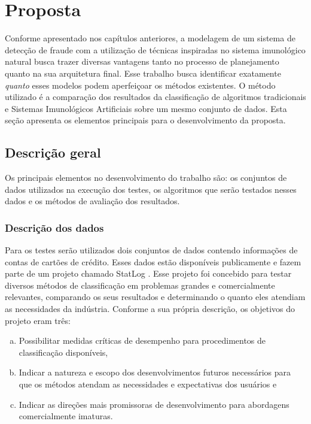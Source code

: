\chapter{Proposta}

Conforme apresentado nos capítulos anteriores, a modelagem de um sistema de detecção de fraude com a utilização de técnicas inspiradas no sistema imunológico natural busca trazer diversas vantagens tanto no processo de planejamento quanto na sua arquitetura final. Esse trabalho busca identificar exatamente \emph{quanto} esses modelos podem aperfeiçoar os métodos existentes. O método utilizado é a comparação dos resultados da classificação de algoritmos tradicionais e Sistemas Imunológicos Artificiais sobre um mesmo conjunto de dados. Esta seção apresenta os elementos principais para o desenvolvimento da proposta.

\section{Descrição geral}

Os principais elementos no desenvolvimento do trabalho são: os conjuntos de dados utilizados na execução dos testes, os algoritmos que serão testados nesses dados e os métodos de avaliação dos resultados.

\subsection{Descrição dos dados}

Para os testes serão utilizados dois conjuntos de dados contendo informações de contas de cartões de crédito. Esses dados estão disponíveis publicamente e fazem parte de um projeto chamado StatLog \cite{Michie1994}. Esse projeto foi concebido para testar diversos métodos de classificação em problemas grandes e comercialmente relevantes, comparando os seus resultados e determinando o quanto eles atendiam as necessidades da indústria. Conforme a sua própria descrição, os objetivos do projeto eram três:

\begin{enumerate}[a)]
    \item Possibilitar medidas críticas de desempenho para procedimentos de classificação disponíveis,
    \item Indicar a natureza e escopo dos desenvolvimentos futuros necessários para que os métodos atendam as necessidades e expectativas dos usuários e
    \item Indicar as direções mais promissoras de desenvolvimento para abordagens comercialmente imaturas.
\end{enumerate}

